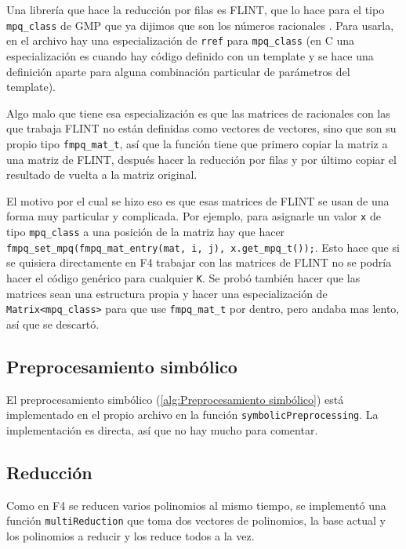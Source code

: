 \documentclass[12pt]{report}
\theoremstyle{customstyle}
\theoremstyle{factstyle}
\newcommand\cpp{C\nolinebreak[4]\hspace{-.05em}\raisebox{.4ex}{\relsize{-3}{\textbf{++}}}\xspace}
\begin{document}
Una librería que hace la reducción por filas es FLINT, que lo hace para el tipo \texttt{mpq\_class} de GMP que ya dijimos que son los números racionales \cite{lib:flint, lib:gmp}. Para usarla, en el archivo  hay una especialización de \texttt{rref} para \texttt{mpq\_class} (en \cpp una especialización es cuando hay código definido con un template y se hace una definición aparte para alguna combinación particular de parámetros del template).

Algo malo que tiene esa especialización es que las matrices de racionales con las que trabaja FLINT no están definidas como vectores de vectores, sino que son su propio tipo \texttt{fmpq\_mat\_t}, así que la función tiene que primero copiar la matriz a una matriz de FLINT, después hacer la reducción por filas y por último copiar el resultado de vuelta a la matriz original.

El motivo por el cual se hizo eso es que esas matrices de FLINT se usan de una forma muy particular y complicada. Por ejemplo, para asignarle un valor \texttt{x} de tipo \texttt{mpq\_class} a una posición de la matriz hay que hacer \texttt{fmpq\_set\_mpq(fmpq\_mat\_entry(mat, i, j), x.get\_mpq\_t());}. Esto hace que si se quisiera directamente en F4 trabajar con las matrices de FLINT no se podría hacer el código genérico para cualquier \texttt{K}. Se probó también hacer que las matrices sean una estructura propia y hacer una especialización de \texttt{Matrix<mpq\_class>} para que use \texttt{fmpq\_mat\_t} por dentro, pero andaba mas lento, así que se descartó.

\subsection{Preprocesamiento simbólico}

El preprocesamiento simbólico (\cref{alg:Preprocesamiento simbólico}) está implementado en el propio archivo  en la función \texttt{symbolicPreprocessing}. La implementación es directa, así que no hay mucho para comentar.

\subsection{Reducción}

Como en F4 se reducen varios polinomios al mismo tiempo, se implementó una función \texttt{multiReduction} que toma dos vectores de polinomios, la base actual y los polinomios a reducir y los reduce todos a la vez.
\end{document}
